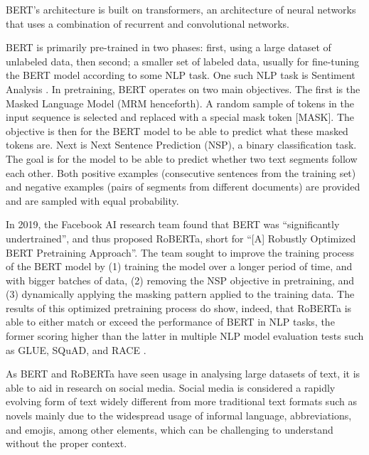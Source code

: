 BERT’s architecture is built on transformers, an architecture of neural networks that uses a combination of recurrent and convolutional networks. 

BERT is primarily pre-trained in two phases: first, using a large dataset of unlabeled data, then second; a smaller set of labeled data, usually for fine-tuning the BERT model according to some NLP task. One such NLP task is Sentiment Analysis \cite{RRL_Koroteev-2021}. In pretraining, BERT operates on two main objectives. The first is the Masked Language Model (MRM henceforth). A random sample of tokens in the input sequence is selected and replaced with a special mask token [MASK]. The objective is then for the BERT model to be able to predict what these masked tokens are. Next is Next Sentence Prediction (NSP), a binary classification task. The goal is for the model to be able to predict whether two text segments follow each other. Both positive examples (consecutive sentences from the training set) and negative examples (pairs of segments from different documents) are provided and are sampled with equal probability.

In 2019, the Facebook AI research team found that BERT was “significantly undertrained”, and thus proposed RoBERTa, short for “[A] Robustly Optimized BERT Pretraining Approach”. The team sought to improve the training process of the BERT model by (1) training the model over a longer period of time, and with bigger batches of data, (2) removing the NSP objective in pretraining, and (3) dynamically applying the masking pattern applied to the training data. The results of this optimized pretraining process do show, indeed, that RoBERTa is able to either match or exceed the performance of BERT in NLP tasks, the former scoring higher than the latter in multiple NLP model evaluation tests such as GLUE, SQuAD, and RACE \cite{RRL_Liu-2019}.

As BERT and RoBERTa have seen usage in analysing large datasets of text, it is able to aid in research on social media. Social media is considered a rapidly evolving form of text widely different from more traditional text formats such as novels mainly due to the widespread usage of informal language, abbreviations, and emojis, among other elements, which can be challenging to understand without the proper context.

